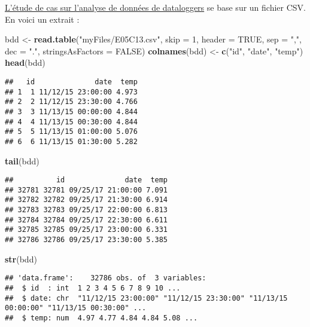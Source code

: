 \documentclass[]{book}
\newenvironment{Shaded}{\begin{snugshade}}{\end{snugshade}}
\newcommand{\KeywordTok}[1]{\textcolor[rgb]{0.13,0.29,0.53}{\textbf{#1}}}
\newcommand{\DataTypeTok}[1]{\textcolor[rgb]{0.13,0.29,0.53}{#1}}
\newcommand{\DecValTok}[1]{\textcolor[rgb]{0.00,0.00,0.81}{#1}}
\newcommand{\StringTok}[1]{\textcolor[rgb]{0.31,0.60,0.02}{#1}}
\newcommand{\OtherTok}[1]{\textcolor[rgb]{0.56,0.35,0.01}{#1}}
\newcommand{\NormalTok}[1]{#1}
\theoremstyle{definition}
\theoremstyle{definition}
\theoremstyle{definition}
\theoremstyle{remark}
\begin{document}
\protect\hyperlink{studyCase001}{L'étude de cas sur l'analyse de données
de dataloggers} se base sur un fichier CSV. En voici un extrait :

\begin{Shaded}
\begin{Highlighting}[]
\NormalTok{bdd <-}\StringTok{ }\KeywordTok{read.table}\NormalTok{(}\StringTok{"myFiles/E05C13.csv"}\NormalTok{, }\DataTypeTok{skip =} \DecValTok{1}\NormalTok{, }\DataTypeTok{header =} \OtherTok{TRUE}\NormalTok{, }
  \DataTypeTok{sep =} \StringTok{","}\NormalTok{, }\DataTypeTok{dec =} \StringTok{"."}\NormalTok{, }\DataTypeTok{stringsAsFactors =} \OtherTok{FALSE}\NormalTok{)}
\KeywordTok{colnames}\NormalTok{(bdd) <-}\StringTok{ }\KeywordTok{c}\NormalTok{(}\StringTok{"id"}\NormalTok{, }\StringTok{"date"}\NormalTok{, }\StringTok{"temp"}\NormalTok{)}
\KeywordTok{head}\NormalTok{(bdd)}
\end{Highlighting}
\end{Shaded}

\begin{verbatim}
##   id              date  temp
## 1  1 11/12/15 23:00:00 4.973
## 2  2 11/12/15 23:30:00 4.766
## 3  3 11/13/15 00:00:00 4.844
## 4  4 11/13/15 00:30:00 4.844
## 5  5 11/13/15 01:00:00 5.076
## 6  6 11/13/15 01:30:00 5.282
\end{verbatim}

\begin{Shaded}
\begin{Highlighting}[]
\KeywordTok{tail}\NormalTok{(bdd)}
\end{Highlighting}
\end{Shaded}

\begin{verbatim}
##          id              date  temp
## 32781 32781 09/25/17 21:00:00 7.091
## 32782 32782 09/25/17 21:30:00 6.914
## 32783 32783 09/25/17 22:00:00 6.813
## 32784 32784 09/25/17 22:30:00 6.611
## 32785 32785 09/25/17 23:00:00 6.331
## 32786 32786 09/25/17 23:30:00 5.385
\end{verbatim}

\begin{Shaded}
\begin{Highlighting}[]
\KeywordTok{str}\NormalTok{(bdd)}
\end{Highlighting}
\end{Shaded}

\begin{verbatim}
## 'data.frame':    32786 obs. of  3 variables:
##  $ id  : int  1 2 3 4 5 6 7 8 9 10 ...
##  $ date: chr  "11/12/15 23:00:00" "11/12/15 23:30:00" "11/13/15 00:00:00" "11/13/15 00:30:00" ...
##  $ temp: num  4.97 4.77 4.84 4.84 5.08 ...
\end{verbatim}
\end{document}
